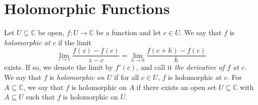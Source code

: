\documentclass[a4paper, openany]{memoir}
\theoremstyle{definition}
\theoremstyle{plain}
\newtheorem{proposition}[definition]{Proposition}
\begin{document}

    \newpage

    \section{Holomorphic Functions}
    Let $U \subseteq \mathbb{C}$ be open, $f \colon U \to \mathbb{C}$ be a function and let $c \in U$. We say that $f$ is \emph{holomorphic at $c$} if the limit
    \[\lim_{z \to c} \frac{f(z) - f(c)}{z - c}= \lim_{h \to 0} \frac{f(c + h) - f(c)}{h}\]
    exists. If so, we denote the limit by $f'(c)$, and call it \emph{the derivative of $f$ at $c$}. We say that $f$ is \emph{holomorphic on $U$} if for all $c \in U$, $f$ is holomorphic at $c$. For $A \subseteq \mathbb{C}$, we say that $f$ is holomorphic on $A$ if there exists an open set $U \subseteq \mathbb{C}$ with $A \subseteq U$ such that $f$ is holomorphic on $U$.
\end{document}
